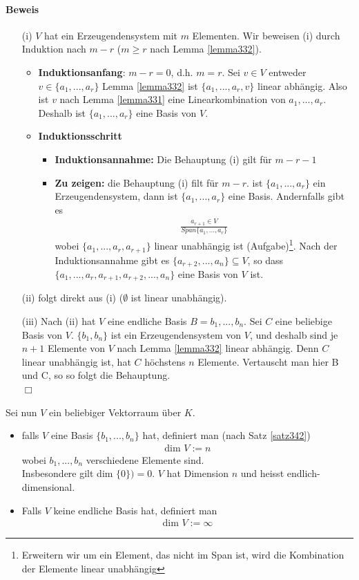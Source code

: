 \documentclass[11pt]{report}
\newcommand*\f[1] {\textbf{#1}}
\begin{document}
\paragraph{Beweis}
\begin{itemize}
 \item[(i)] $V$ hat ein Erzeugendensystem mit $m$ Elementen. Wir beweisen (i) durch Induktion nach $m-r$ ($m \geq r$ nach Lemma \ref{lemma332}).
\begin{itemize}
 \item \f{Induktionsanfang}: $m-r=0$, d.h. $m=r$. Sei $v \in V$ entweder $v \in  \{a_1, ..., a_r\}$ Lemma \ref{lemma332} ist $\{a_1, ..., a_{r}, v\}$ linear abhängig. Also ist $v$ nach Lemma \ref{lemma331} eine Linearkombination von $a_1, ..., a_r$. Deshalb ist $\{a_1, ..., a_r\}$ eine Basis von $V$.
\item \f{Induktionsschritt}
\begin{itemize}
 \item \f{Induktionsannahme:} Die Behauptung (i) gilt für $m-r-1$
 \item \f{Zu zeigen:} die Behauptung (i) filt für $m-r$.
ist $\{a_1, ..., a_r\}$ ein Erzeugendensystem, dann ist $\{a_1, ..., a_r\}$ eine Basis. Andernfalls gibt es
\begin{align}
 \frac{a_{r+1} \in V}{Span\{a_1, ..., a_r\}}
\end{align}
wobei $\{a_1, ..., a_r, a_{r+1}\}$ linear unabhängig ist (Aufgabe)\footnote{Erweitern wir um ein Element, das nicht im Span ist, wird die Kombination der Elemente linear unabhängig}. Nach der Induktionsannahme gibt es $\{a_{r+2}, ..., a_n\} \subseteq V$, so dass $\{a_1, ..., a_r, a_{r+1}, a_{r+2}, ..., a_n\}$ eine Basis von $V$ ist.
\end{itemize}
\end{itemize}
\item[(ii)] folgt direkt aus (i) ($\emptyset$ ist linear unabhängig).\\
\item[(iii)] Nach (ii) hat $V$ eine endliche Basis $B={b_1, ..., b_n}$. Sei $C$ eine beliebige Basis von $V$. $\{b_1, b_n\}$ ist ein Erzeugendensystem von $V$, und deshalb sind je $n+1$ Elemente von $V$ nach Lemma \ref{lemma332} linear abhängig. Denn $C$ linear unabhängig ist, hat $C$ höchstens $n$ Elemente. Vertauscht man hier B und C, so so folgt die Behauptung. \\ \hspace*{1cm}\hfill $\Box$
\end{itemize}
Sei nun $V$ ein beliebiger Vektorraum über $K$.
\begin{itemize}
 \item falls $V$ eine Basis $\{b_1, ..., b_n\}$ hat, definiert man (nach Satz \ref{satz342})
\begin{align}
 \text{dim } V := n
\end{align}
wobei $b_1, ..., b_n$ verschiedene Elemente sind.\\
Insbesondere gilt dim $\{0\}) = 0$. $V$ hat Dimension $n$ und heisst endlich-dimensional.
\item Falls $V$ keine endliche Basis hat, definiert man
\begin{align}
 \text{dim } V := \infty
\end{align}
\end{itemize}
\end{document}
